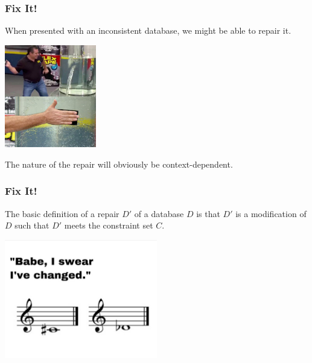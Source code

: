 \begin{frame}
\frametitle{Fix It!}

When presented with an inconsistent database, we might be able to repair it. 

\begin{center}
	\includegraphics[width=0.3\textwidth]{images/flextape.png}
\end{center}

The nature of the repair will obviously be context-dependent. 

\end{frame}


\begin{frame}
\frametitle{Fix It!}

The basic definition of a repair $D'$ of a database $D$ is that $D'$ is a modification of $D$ such that $D'$ meets the constraint set $C$.

\begin{center}
	\includegraphics[width=0.5\textwidth]{images/changed.png}
\end{center}


\end{frame}

